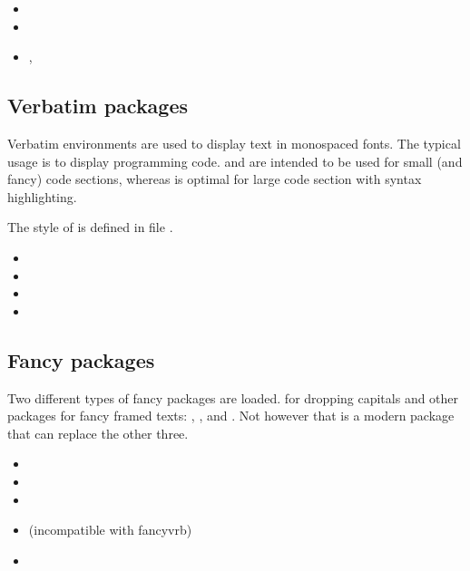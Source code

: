 \begin{itemize}[noitemsep]
\item {}
\item {}
\item {}, 
\end{itemize}


\subsection{Verbatim packages}

Verbatim environments are used to display text in monospaced fonts. The typical usage is to display programming code.  and  are intended to be used for small (and fancy) code sections, whereas  is optimal for large code section with syntax highlighting.

The style of  is defined in file 
.

\begin{itemize}[noitemsep]
\item {}
\item {}
\item {}
\item {}
\end{itemize}


\subsection{Fancy packages}

Two different types of fancy packages are loaded.  for dropping capitals and other packages for fancy framed texts: , ,  and . Not however that  is a modern package that can replace the other three.

\begin{itemize}[noitemsep]
\item {} 
\item {}
\item {}
\item {} (incompatible with fancyvrb)
\item {}
\end{itemize}

